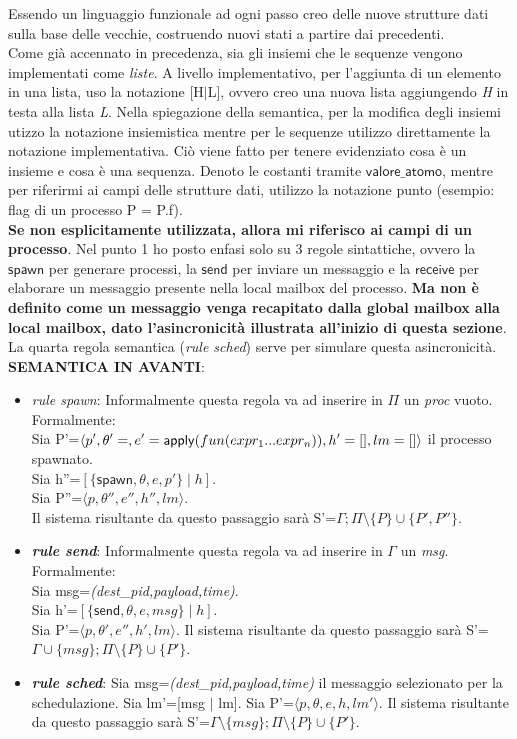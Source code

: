 \documentclass[background.tex]{subfiles}
\begin{document}
Essendo un linguaggio funzionale ad ogni passo creo delle nuove strutture dati sulla base delle vecchie, costruendo nuovi stati a partire dai precedenti.\\
Come già accennato in precedenza, sia gli insiemi che le sequenze vengono implementati come \textit{liste}. A livello implementativo, per l'aggiunta di un elemento in una lista, uso la notazione [H$\mid$L], ovvero creo una nuova lista aggiungendo \textit{H} in testa alla lista \textit{L}.
Nella spiegazione della semantica, per la modifica degli insiemi utizzo la notazione insiemistica mentre per le sequenze utilizzo direttamente la notazione implementativa.
Ciò viene fatto per tenere evidenziato cosa è un insieme e cosa è una sequenza.
Denoto le costanti tramite $\mathsf{valore\_atomo}$, mentre per riferirmi ai campi delle strutture dati, utilizzo la notazione punto (esempio: flag di un processo P = P.f).\\
\textbf{Se non esplicitamente utilizzata, allora mi riferisco ai campi di un processo}.
Nel punto 1 ho posto enfasi solo su 3 regole sintattiche, ovvero la $\mathsf{spawn}$ per generare processi, la $\mathsf{send}$ per inviare un messaggio e la $\mathsf{receive}$ per elaborare un messaggio presente nella local mailbox del processo.
\textbf{Ma non è definito come un messaggio venga recapitato dalla global mailbox alla local mailbox, dato l'asincronicità illustrata all'inizio di questa sezione}. La quarta regola semantica (\textit{rule sched}) serve per simulare questa asincronicità.\\
\textbf{SEMANTICA IN AVANTI}:
\begin{itemize}
	\item \textit{rule spawn}: Informalmente questa regola va ad inserire in $\Pi$ un \textit{proc} vuoto. Formalmente:\\
	Sia P'=$\displaystyle \langle p',\theta'=\empty,e'=\mathsf{apply}(fun(expr_{1}...expr_{n})),h'=[],lm=[]\rangle$ il processo spawnato.\\
	Sia h''=$\displaystyle [\{\mathsf{spawn},\theta,e,p'\} \mid h]$.\\
	Sia P''=$\displaystyle \langle p,\theta'',e'',h'',lm\rangle$.\\
	Il sistema risultante da questo passaggio sarà S'=$\displaystyle \Gamma;\Pi\setminus\{P\}\cup\{P',P''\}$.
	\item \textit{\textbf{rule send}}: Informalmente questa regola va ad inserire in $\Gamma$ un \textit{msg}. Formalmente:\\
	Sia msg=\textit{(dest\_pid,payload,time)}.\\
	Sia h'=$\displaystyle [\{\mathsf{send},\theta,e,msg\} \mid h]$.\\
	Sia P'=$\displaystyle \langle p,\theta',e'',h',lm \rangle$.
	Il sistema risultante da questo passaggio sarà S'=$\displaystyle \Gamma\cup\{msg\};\Pi\setminus\{P\}\cup\{P'\}$.
	\item \textit{\textbf{rule sched}}: 
	Sia msg=\textit{(dest\_pid,payload,time)} il messaggio selezionato per la schedulazione.
	Sia lm'=[msg $\mid$ lm].
	Sia P'=$\displaystyle \langle p,\theta,e,h,lm'\rangle$.
	Il sistema risultante da questo passaggio sarà S'=$\displaystyle \Gamma\setminus\{msg\};\Pi\setminus\{P\}\cup\{P'\}$.
\end{itemize}
\end{document}

